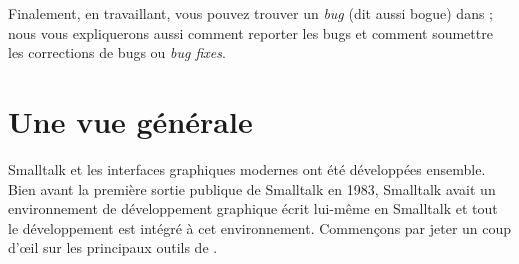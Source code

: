 \documentclass[a4paper,10pt,twoside]{book}
\begin{document}
Finalement, en travaillant, vous pouvez trouver un \emph{bug} (dit aussi bogue) dans \pharo;
nous vous expliquerons aussi comment reporter les bugs
et comment soumettre les corrections de bugs ou \emph{bug fixes}.

\section{Une vue générale}

Smalltalk et les interfaces graphiques modernes ont été développées ensemble.
Bien avant la première sortie publique de Smalltalk en 1983, Smalltalk
avait un environnement de développement graphique écrit lui-même en Smalltalk et
tout le développement est intégré à cet environnement.
Commençons par jeter un coup d'\oe il sur les principaux outils de
\pharo. %
\end{document}
